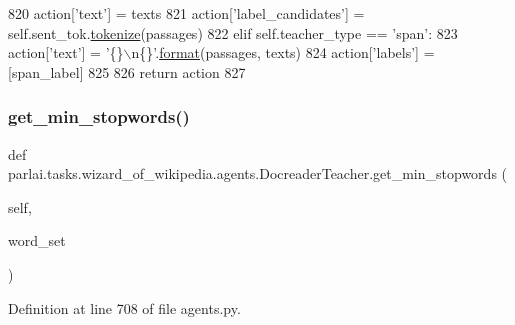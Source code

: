 \begin{DoxyCode}
820             action[\textcolor{stringliteral}{'text'}] = texts
821             action[\textcolor{stringliteral}{'label\_candidates'}] = self.sent\_tok.\hyperlink{namespaceparlai_1_1agents_1_1tfidf__retriever_1_1build__tfidf_a1fdb457e98eb4e4c26047e229686a616}{tokenize}(passages)
822         \textcolor{keywordflow}{elif} self.teacher\_type == \textcolor{stringliteral}{'span'}:
823             action[\textcolor{stringliteral}{'text'}] = \textcolor{stringliteral}{'\{\}\(\backslash\)n\{\}'}.\hyperlink{namespaceparlai_1_1chat__service_1_1services_1_1messenger_1_1shared__utils_a32e2e2022b824fbaf80c747160b52a76}{format}(passages, texts)
824             action[\textcolor{stringliteral}{'labels'}] = [span\_label]
825 
826         \textcolor{keywordflow}{return} action
827 
\end{DoxyCode}
\mbox{\label{classparlai_1_1tasks_1_1wizard__of__wikipedia_1_1agents_1_1DocreaderTeacher_a5dba8f178a059e0daae7fec42bfc4330}} 
\subsubsection{\texorpdfstring{get\+\_\+min\+\_\+stopwords()}{get\_min\_stopwords()}}
{\footnotesize\ttfamily def parlai.\+tasks.\+wizard\+\_\+of\+\_\+wikipedia.\+agents.\+Docreader\+Teacher.\+get\+\_\+min\+\_\+stopwords (\begin{DoxyParamCaption}\item[{}]{self,  }\item[{}]{word\+\_\+set }\end{DoxyParamCaption})}



Definition at line 708 of file agents.\+py.


